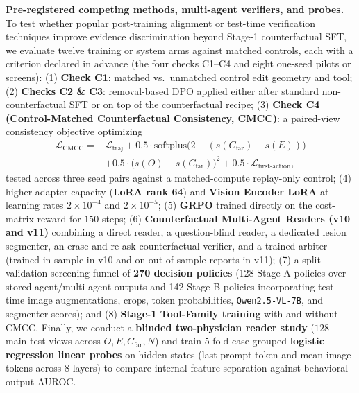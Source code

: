 \documentclass[5p,times,twocolumn,authoryear]{elsarticle}
\begin{document}
\textbf{Pre-registered competing methods, multi-agent verifiers, and probes.} To test whether popular post-training alignment or test-time verification techniques improve evidence discrimination beyond Stage-1 counterfactual SFT, we evaluate twelve training or system arms against matched controls, each with a criterion declared in advance (the four checks C1--C4 and eight one-seed pilots or screens):
(1) \textbf{Check C1}: matched vs.\ unmatched control edit geometry and tool;
(2) \textbf{Checks C2 \& C3}: removal-based DPO \citep{rafailov2023dpo} applied either after standard non-counterfactual SFT or on top of the counterfactual recipe;
(3) \textbf{Check C4 (Control-Matched Counterfactual Consistency, CMCC)}: a paired-view consistency objective optimizing
\begin{equation}
\label{eq:cmcc}
\begin{split}
\mathcal{L}_{\text{CMCC}} = {}& \mathcal{L}_{\text{traj}} + 0.5 \cdot \text{softplus}\big(2 - (s(C_{\text{far}}) - s(E))\big)\\
&+ 0.5 \cdot \big(s(O) - s(C_{\text{far}})\big)^2 + 0.5 \cdot \mathcal{L}_{\text{first-action}},
\end{split}
\end{equation}
tested across three seed pairs against a matched-compute replay-only control;
(4) higher adapter capacity (\textbf{LoRA rank 64}) and \textbf{Vision Encoder LoRA} at learning rates $2\times 10^{-4}$ and $2\times 10^{-5}$;
(5) \textbf{GRPO} \citep{shao2024deepseekmath} trained directly on the cost-matrix reward for $150$ steps;
(6) \textbf{Counterfactual Multi-Agent Readers (v10 and v11)} combining a direct reader, a question-blind reader, a dedicated lesion segmenter, an erase-and-re-ask counterfactual verifier, and a trained arbiter (trained in-sample in v10 and on out-of-sample reports in v11);
(7) a split-validation screening funnel of \textbf{270 decision policies} (128 Stage-A policies over stored agent/multi-agent outputs and 142 Stage-B policies incorporating test-time image augmentations, crops, token probabilities, \texttt{Qwen2.5-VL-7B}, and segmenter scores); and
(8) \textbf{Stage-1 Tool-Family training} with and without CMCC.
Finally, we conduct a \textbf{blinded two-physician reader study} ($128$ main-test views across $O, E, C_{\text{far}}, N$) and train $5$-fold case-grouped \textbf{logistic regression linear probes} \citep{alain2016understanding} on hidden states (last prompt token and mean image tokens across $8$ layers) to compare internal feature separation against behavioral output AUROC.
\end{document}
